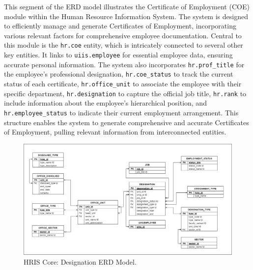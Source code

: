     This segment of the ERD model illustrates the Certificate of Employment (COE) module within the Human Resource Information System. The system is designed to efficiently manage and generate Certificates of Employment, incorporating various relevant factors for comprehensive employee documentation. Central to this module is the \texttt{hr.coe} entity, which is intricately connected to several other key entities. It links to \texttt{uiis.employee} for essential employee data, ensuring accurate personal information. The system also incorporates \texttt{hr.prof\_title} for the employee's professional designation, \texttt{hr.coe\_status} to track the current status of each certificate, \texttt{hr.office\_unit} to associate the employee with their specific department, \texttt{hr.designation} to capture the official job title, \texttt{hr.rank} to include information about the employee's hierarchical position, and \texttt{hr.employee\_status} to indicate their current employment arrangement. This structure enables the system to generate comprehensive and accurate Certificates of Employment, pulling relevant information from interconnected entities.

    \begin{figure}[H]
        \centering
        \includegraphics[width=1\linewidth]{figures/images/diagrams/erd/erd-core-office.png}
        \caption{HRIS Core: Designation ERD Model.}
        \label{fig:erd-core-office}
    \end{figure}

